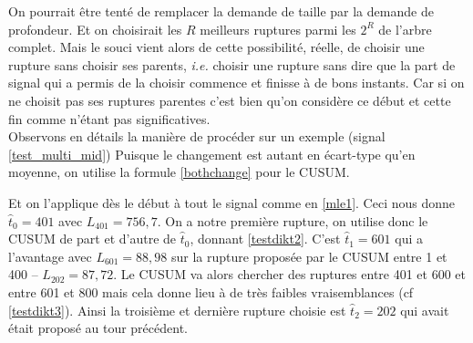 \documentclass[french,11pt,notitlepage]{report}
\begin{document}
	On pourrait être tenté de remplacer la demande de taille par la demande de profondeur.
	Et on choisirait les $R$ meilleurs ruptures parmi les $2^R$ de l'arbre complet.
	Mais le souci vient alors de cette possibilité, réelle, de choisir une rupture sans choisir ses parents, \emph{i.e.}
	choisir une rupture sans dire que la part de signal qui a permis de la choisir commence et finisse à de bons instants.
	Car si on ne choisit pas ses ruptures parentes c'est bien qu'on considère ce début et cette fin comme n'étant pas significatives.
	\\
	
		Observons en détails la manière de procéder sur un exemple (signal \ref{test_multi_mid})
	Puisque le changement est autant en écart-type qu'en moyenne, on utilise la formule \ref{bothchange} pour le CUSUM.
	
	Et on l'applique dès le début à tout le signal comme en \ref{mle1}.
	Ceci nous donne $\hat t_0=401$ avec $L_{401}=756,7$.
	On a notre première rupture, on utilise donc le CUSUM de part et d'autre de $\hat t_0$, donnant \ref{testdikt2}.
	C'est $\hat t_1=601$ qui a l'avantage avec $L_{601}=88,98$ sur la rupture proposée par le CUSUM entre 1 et 400 -- $L_{202}=87,72$.
	Le CUSUM va alors chercher des ruptures entre 401 et 600 et entre 601 et 800 mais cela donne lieu à de très faibles vraisemblances (cf \ref{testdikt3}).
	Ainsi la troisième et dernière rupture choisie est $\hat t_2=202$ qui avait était proposé au tour précédent.
	
\end{document}

